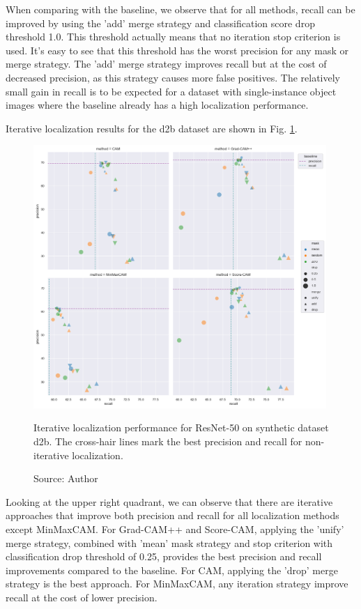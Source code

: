 When comparing with the baseline, we observe that for all methods, recall can be improved by using the 'add' merge strategy and classification score drop threshold 1.0. This threshold actually means that no iteration stop criterion is used. It's easy to see that this threshold has the worst precision for any mask or merge strategy. The 'add' merge strategy improves recall but at the cost of decreased precision, as this strategy causes more false positives. The relatively small gain in recall is to be expected for a dataset with single-instance object images where the baseline already has a high localization performance.

Iterative localization results for the d2b dataset are shown in Fig. \ref{fig:prec_iter_resnet50_syn_d2b}. 

\begin{figure}[h]
    \begin{center}       
    \includegraphics[width=0.99\textwidth]{images/fig_iter_resnet50_syn_d2b.png}
    \caption[Iterative localization performance for ResNet-50 on synthetic dataset d2b]{Iterative localization performance for ResNet-50 on synthetic dataset d2b. The cross-hair lines mark the best precision and recall for non-iterative localization.}
    \caption*{Source: Author}
    \label{fig:prec_iter_resnet50_syn_d2b}
    \end{center}
\end{figure}

Looking at the upper right quadrant, we can observe that there are iterative approaches that improve both precision and recall for all localization methods except MinMaxCAM. For Grad-CAM++ and Score-CAM, applying the 'unify' merge strategy, combined with 'mean' mask strategy and stop criterion with classification drop threshold of 0.25, provides the best precision and recall improvements compared to the baseline. For CAM, applying the 'drop' merge strategy is the best approach. For MinMaxCAM, any iteration strategy improve recall at the cost of lower precision. 

